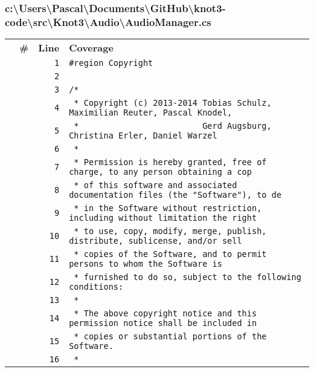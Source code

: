 \documentclass[a4paper,10pt]{article}
\begin{document}
\subsubsection{c:\textbackslash Users\textbackslash Pascal\textbackslash Documents\textbackslash GitHub\textbackslash knot3-code\textbackslash src\textbackslash Knot3\textbackslash Audio\textbackslash AudioManager.cs}
\begin{longtable}[l]{lrrl}
\textbf{} & \textbf{\#} & \textbf{Line} & \textbf{Coverage}\\
\cellcolor{gray} &  & \verb~1~ & \verb~#region Copyright~\\
\cellcolor{gray} &  & \verb~2~ & \verb~~\\
\cellcolor{gray} &  & \verb~3~ & \verb~/*~\\
\cellcolor{gray} &  & \verb~4~ & \verb~ * Copyright (c) 2013-2014 Tobias Schulz, Maximilian Reuter, Pascal Knodel,~\\
\cellcolor{gray} &  & \verb~5~ & \verb~ *                         Gerd Augsburg, Christina Erler, Daniel Warzel~\\
\cellcolor{gray} &  & \verb~6~ & \verb~ *~\\
\cellcolor{gray} &  & \verb~7~ & \verb~ * Permission is hereby granted, free of charge, to any person obtaining a cop~\\
\cellcolor{gray} &  & \verb~8~ & \verb~ * of this software and associated documentation files (the "Software"), to de~\\
\cellcolor{gray} &  & \verb~9~ & \verb~ * in the Software without restriction, including without limitation the right~\\
\cellcolor{gray} &  & \verb~10~ & \verb~ * to use, copy, modify, merge, publish, distribute, sublicense, and/or sell~\\
\cellcolor{gray} &  & \verb~11~ & \verb~ * copies of the Software, and to permit persons to whom the Software is~\\
\cellcolor{gray} &  & \verb~12~ & \verb~ * furnished to do so, subject to the following conditions:~\\
\cellcolor{gray} &  & \verb~13~ & \verb~ *~\\
\cellcolor{gray} &  & \verb~14~ & \verb~ * The above copyright notice and this permission notice shall be included in ~\\
\cellcolor{gray} &  & \verb~15~ & \verb~ * copies or substantial portions of the Software.~\\
\cellcolor{gray} &  & \verb~16~ & \verb~ *~\\

\end{longtable}
\end{document}
